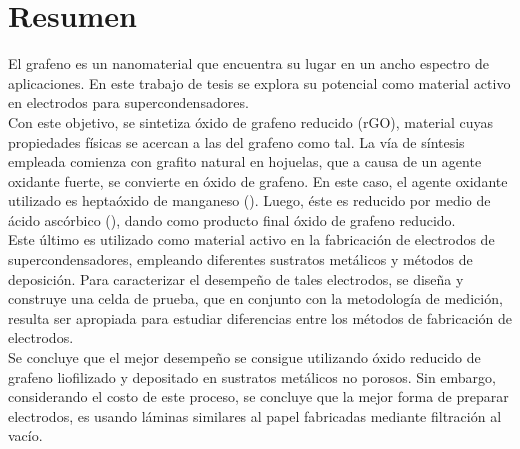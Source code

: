 \chapter*{Resumen}
El grafeno es un nanomaterial que encuentra su lugar en un ancho espectro de aplicaciones. En este trabajo de tesis se explora su potencial como material activo en electrodos para supercondensadores.\\
Con este objetivo, se sintetiza óxido de grafeno reducido (rGO), material cuyas propiedades físicas se acercan a las del grafeno como tal. La vía de síntesis empleada comienza con grafito natural en hojuelas, que a causa de un agente oxidante fuerte, se convierte en óxido de grafeno. En este caso, el agente oxidante utilizado es heptaóxido de manganeso (). Luego, éste es reducido por medio de ácido ascórbico (), dando como producto final óxido de grafeno reducido.\\
Este último es utilizado como material activo en la fabricación de electrodos de supercondensadores, empleando diferentes sustratos metálicos y métodos de deposición. Para caracterizar el desempeño de tales electrodos, se diseña y construye una celda de prueba, que en conjunto con la metodología de medición, resulta ser apropiada para estudiar diferencias entre los métodos de fabricación de electrodos.\\
Se concluye que el mejor desempeño se consigue utilizando óxido reducido de grafeno liofilizado y depositado en sustratos metálicos no porosos. Sin embargo, considerando el costo de este proceso, se concluye que la mejor forma de preparar electrodos, es usando láminas similares al papel fabricadas mediante filtración al vacío.
